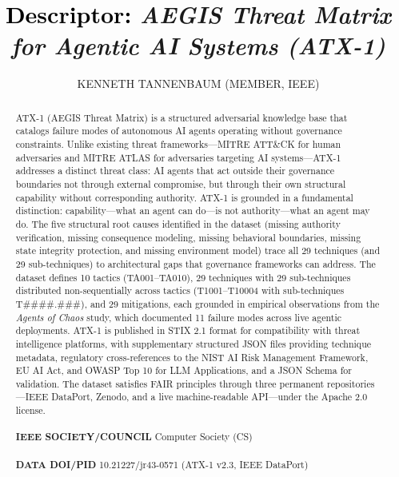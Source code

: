 \documentclass{IEEEoj-data}
\newcommand{\replaced}[2]{#1}
\newcommand{\deleted}[1]{}
\begin{document}
\title{\textcolor{black}{Descriptor:} \textcolor{ieeedata}{\textit{ AEGIS\deleted{\texttrademark{}} Threat Matrix for Agentic AI Systems (ATX-1)}}}

\author{KENNETH TANNENBAUM (MEMBER, IEEE)}

\begin{abstract}
ATX-1 (AEGIS Threat Matrix) is a structured adversarial knowledge base that catalogs failure modes of autonomous AI agents operating without governance constraints. Unlike existing threat frameworks---MITRE ATT\&CK for human adversaries and MITRE ATLAS for adversaries targeting AI systems---ATX-1 addresses a distinct threat class: AI agents that act outside their governance boundaries not through external compromise, but through their own structural capability without corresponding authority. ATX-1 is grounded in a fundamental distinction: capability---what an agent can do---is not authority---what an agent may do. The \replaced{five}{four} structural root causes identified in the dataset (missing authority verification, missing consequence modeling, missing behavioral boundaries, \replaced{missing state integrity protection, and missing environment model}{and missing state integrity protection}) trace all \replaced{29 techniques (and 29 sub-techniques)}{20 techniques} to architectural gaps that governance frameworks can address. The dataset defines \replaced{10 tactics (TA001--TA010)}{9 tactics (TA001--TA009)}, \replaced{29 techniques with 29 sub-techniques distributed non-sequentially across tactics (T1001--T10004 with sub-techniques T\#\#\#\#.\#\#\#)}{20 techniques distributed non-sequentially across tactics (T1001--T9001)}, and \replaced{29 mitigations}{20 mitigations}, each grounded in empirical observations from the {\it Agents of Chaos} study, which documented 11 failure modes across live agentic deployments. ATX-1 is published in STIX 2.1 format for compatibility with threat intelligence platforms, with supplementary structured JSON files providing technique metadata, regulatory cross-references to the NIST AI Risk Management Framework, EU AI Act, and OWASP Top 10 for LLM Applications, and a JSON Schema for validation. The dataset satisfies FAIR principles through three permanent repositories---IEEE DataPort, Zenodo, and a live machine-readable API---under the Apache 2.0 license.\\
\\
{\textcolor{ieeedata}{\abstractheadfont\bfseries{IEEE SOCIETY/COUNCIL}}} Computer Society (CS)\\
\\
{\textcolor{ieeedata}{\abstractheadfont\bfseries{DATA DOI/PID}}} \replaced{10.21227/jr43-0571 (ATX-1 v2.3, IEEE DataPort)}{10.21227/f87b-1d57 (ATX-1 v1.0)}\\


\end{abstract}
\end{document}
